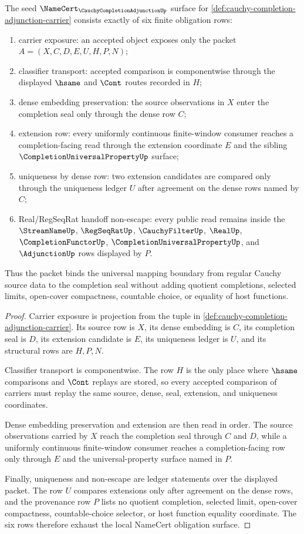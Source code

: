 \begin{theorem}
\label{thm:cauchy-completion-adjunction-namecert-obligations}
The seed $\NameCert_{\CauchyCompletionAdjunctionUp}$ surface for \autoref{def:cauchy-completion-adjunction-carrier} consists exactly of six finite obligation rows:
\begin{enumerate}
\item carrier exposure: an accepted object exposes only the packet $A=(X,C,D,E,U,H,P,N)$;
\item classifier transport: accepted comparison is componentwise through the displayed $\hsame$ and $\Cont$ routes recorded in $H$;
\item dense embedding preservation: the source observations in $X$ enter the completion seal only through the dense row $C$;
\item extension row: every uniformly continuous finite-window consumer reaches a completion-facing read through the extension coordinate $E$ and the sibling $\CompletionUniversalPropertyUp$ surface;
\item uniqueness by dense row: two extension candidates are compared only through the uniqueness ledger $U$ after agreement on the dense rows named by $C$;
\item Real/RegSeqRat handoff non-escape: every public read remains inside the $\StreamNameUp$, $\RegSeqRatUp$, $\CauchyFilterUp$, $\RealUp$, $\CompletionFunctorUp$, $\CompletionUniversalPropertyUp$, and $\AdjunctionUp$ rows displayed by $P$.
\end{enumerate}
Thus the packet binds the universal mapping boundary from regular Cauchy source data to the completion seal without adding quotient completions, selected limits, open-cover compactness, countable choice, or equality of host functions.
\end{theorem}
\begin{proof}
Carrier exposure is projection from the tuple in \autoref{def:cauchy-completion-adjunction-carrier}. Its source row is $X$, its dense embedding is $C$, its completion seal is $D$, its extension candidate is $E$, its uniqueness ledger is $U$, and its structural rows are $H,P,N$.

Classifier transport is componentwise. The row $H$ is the only place where $\hsame$ comparisons and $\Cont$ replays are stored, so every accepted comparison of carriers must replay the same source, dense, seal, extension, and uniqueness coordinates.

Dense embedding preservation and extension are then read in order. The source observations carried by $X$ reach the completion seal through $C$ and $D$, while a uniformly continuous finite-window consumer reaches a completion-facing row only through $E$ and the universal-property surface named in $P$.

Finally, uniqueness and non-escape are ledger statements over the displayed packet. The row $U$ compares extensions only after agreement on the dense rows, and the provenance row $P$ lists no quotient completion, selected limit, open-cover compactness, countable-choice selector, or host function equality coordinate. The six rows therefore exhaust the local NameCert obligation surface.
\end{proof}
